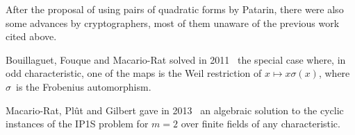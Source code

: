 \documentclass{lms}
\def\F{\mathbb{F}}
\begin{document}
% 
After the proposal of using pairs of quadratic forms by Patarin,
there were also some advances by cryptographers,
most of them unaware of the previous work cited above.

Bouillaguet, Fouque and Macario-Rat solved
in 2011~\cite{DBLP:conf/asiacrypt/BouillaguetFM11}
the special case where, in odd characteristic,
one of the maps is the Weil restriction of $x ↦ x σ(x)$,
where $σ$~is the Frobenius automorphism.

Macario-Rat, Plût and Gilbert gave in 2013~\cite{MPG2013}
an algebraic solution to the cyclic instances of the IP1S problem
for $m=2$ over finite fields of any characteristic.
\end{document}
